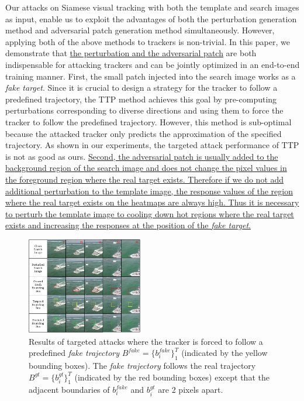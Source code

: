 \documentclass[journal]{IEEEtran}
\begin{document}
Our attacks on Siamese visual tracking with both the template and search images as input, enable us to exploit the advantages of both the perturbation generation method \cite{FGSM} and adversarial patch generation method \cite{patch} simultaneously. However, applying both of the above methods to trackers is non-trivial. In this paper, we demonstrate that \uline{the perturbation and the adversarial patch} are both indispensable for attacking trackers and can be jointly optimized in an end-to-end training manner. First, the small patch injected into the search image works as a \textit{fake target}. Since it is crucial to design a strategy for the tracker to follow a predefined trajectory, the TTP method \cite{TTP} achieves this goal by pre-computing perturbations corresponding to diverse directions and using them to force the tracker to follow the predefined trajectory. However, this method is sub-optimal because the attacked tracker only predicts the approximation of the specified trajectory. As shown in our experiments, the targeted attack performance of TTP is not as good as ours.
\uline{Second, the adversarial patch is usually added to the background region of the search image and does not change the pixel values in the foreground region where the real target exists. Therefore if we do not add additional perturbation to the template image, the response values of the region where the real target exists on the heatmaps are always high. Thus it is necessary to perturb the template image to cooling down hot regions where the real target exists and increasing the responses at the position of the \textit{fake target}.}
\vspace{-3mm}

\begin{figure}[t]
  \centering
  \includegraphics[width=0.45\textwidth]{images_imperceptible/vis_v7.pdf}
  \caption{Results of targeted attacks where the tracker is forced to follow a predefined \textit{fake trajectory} $B^{fake}=\{b^{fake}_i\}_1^{T}$ (indicated by the yellow bounding boxes). The \textit{fake trajectory} follows the real trajectory $B^{gt}=\{b^{gt}_i\}_1^T$ (indicated by the red bounding boxes) except that the adjacent boundaries of $b^{fake}_i$ and $b^{gt}_i$ are 2 pixels apart.}
  \label{fig:vis1}
  \vspace{-3mm}
\end{figure}
\end{document}
